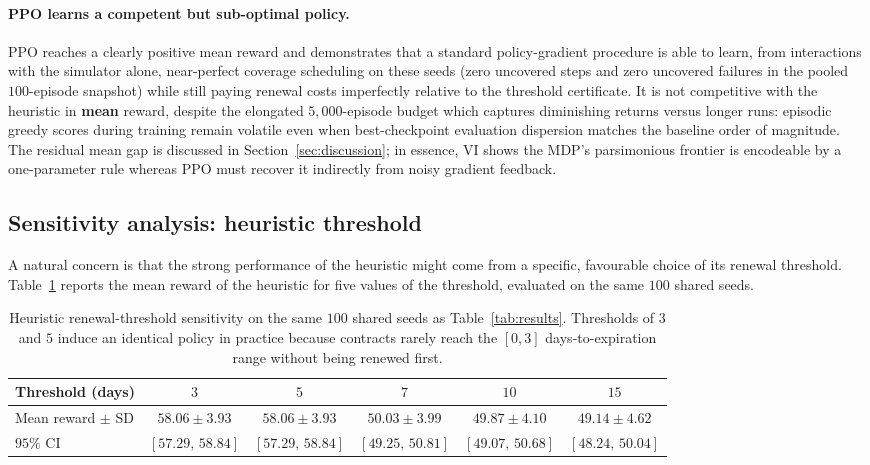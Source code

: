 \paragraph{PPO learns a competent but sub-optimal policy.}
PPO reaches a clearly positive mean reward and demonstrates that a
standard policy-gradient procedure is able to learn, from interactions
with the simulator alone, near-perfect coverage scheduling on these seeds
(zero uncovered steps and zero uncovered failures in the pooled
$100$-episode snapshot) while still paying renewal costs imperfectly relative
to the threshold certificate. It is not competitive with the heuristic in
\textbf{mean} reward, despite the elongated $5{,}000$-episode budget which
captures diminishing returns versus longer runs: episodic greedy scores
during training remain volatile even when best-checkpoint evaluation
dispersion matches the baseline order of magnitude. The residual mean gap is
discussed in Section~\ref{sec:discussion}; in essence, VI shows the MDP's
parsimonious frontier is encodeable by a one-parameter rule whereas PPO must
recover it indirectly from noisy gradient feedback.


\subsection{Sensitivity analysis: heuristic threshold}
\label{subsec:sensitivity}

A natural concern is that the strong performance of the heuristic might
come from a specific, favourable choice of its renewal threshold.
Table~\ref{tab:sensitivity} reports the mean reward of the heuristic for
five values of the threshold, evaluated on the same $100$ shared seeds.

\begin{table}[h]
\centering
\small
\begin{tabular}{lccccc}
\toprule
Threshold (days) & $3$ & $5$ & $7$ & $10$ & $15$ \\
\midrule
Mean reward $\pm$ SD &
    $58.06 \pm 3.93$ &
    $58.06 \pm 3.93$ &
    $50.03 \pm 3.99$ &
    $49.87 \pm 4.10$ &
    $49.14 \pm 4.62$ \\
$95\%$ CI &
    $[57.29,\,58.84]$ &
    $[57.29,\,58.84]$ &
    $[49.25,\,50.81]$ &
    $[49.07,\,50.68]$ &
    $[48.24,\,50.04]$ \\
\bottomrule
\end{tabular}
\caption{Heuristic renewal-threshold sensitivity on the same $100$
         shared seeds as Table~\ref{tab:results}. Thresholds of $3$
         and $5$ induce an identical policy in practice because
         contracts rarely reach the $[0, 3]$ days-to-expiration range
         without being renewed first.}
\label{tab:sensitivity}
\end{table}

